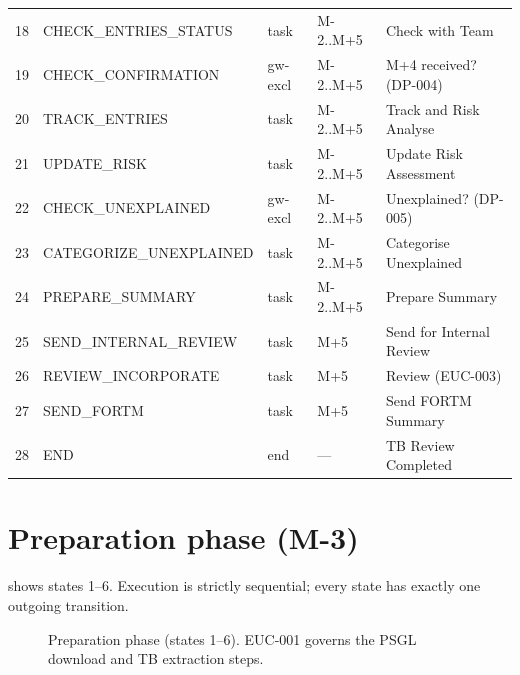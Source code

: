 \documentclass[11pt,a4paper,twoside]{report}
\begin{document}
\begin{table}[htbp]
\begin{tabularx}{\linewidth}{@{}llllX@{}}
18 & CHECK\_ENTRIES\_STATUS        & task         & M-2..M+5   & Check with Team \\
19 & CHECK\_CONFIRMATION           & gw-excl      & M-2..M+5   & M+4 received? (DP-004) \\
20 & TRACK\_ENTRIES                & task         & M-2..M+5   & Track and Risk Analyse \\
21 & UPDATE\_RISK                  & task         & M-2..M+5   & Update Risk Assessment \\
22 & CHECK\_UNEXPLAINED            & gw-excl      & M-2..M+5   & Unexplained? (DP-005) \\
23 & CATEGORIZE\_UNEXPLAINED       & task         & M-2..M+5   & Categorise Unexplained \\
24 & PREPARE\_SUMMARY              & task         & M-2..M+5   & Prepare Summary \\
25 & SEND\_INTERNAL\_REVIEW        & task         & M+5        & Send for Internal Review \\
26 & REVIEW\_INCORPORATE           & task         & M+5        & Review (EUC-003) \\
27 & SEND\_FORTM                   & task         & M+5        & Send FORTM Summary \\
28 & END                           & end          & ---        & TB Review Completed \\
\bottomrule
\end{tabularx}
\end{table}

\section{Preparation phase (M-3)}

 shows states 1--6. Execution is strictly
sequential; every state has exactly one outgoing transition.

\begin{figure}[htbp]
\centering
{}
\caption{Preparation phase (states 1--6). EUC-001 governs the PSGL
download and TB extraction steps.}\label{fig:prep-phase}
\end{figure}
\end{document}
